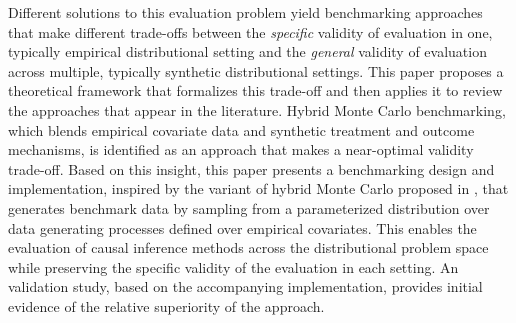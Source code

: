 \documentclass[../main.tex]{subfiles}
\begin{document}
    \vspace{\baselineskip}

    Different solutions to this evaluation problem yield benchmarking approaches that make different trade-offs between the \textit{specific} validity of evaluation in one, typically empirical distributional setting and the \textit{general} validity of evaluation across multiple, typically synthetic distributional settings. This paper proposes a theoretical framework that formalizes this trade-off and then applies it to review the approaches that appear in the literature. Hybrid Monte Carlo benchmarking, which blends empirical covariate data and synthetic treatment and outcome mechanisms, is identified as an approach that makes a near-optimal validity trade-off. Based on this insight, this paper presents a benchmarking design and implementation, inspired by the variant of hybrid Monte Carlo proposed in \textcite{Dorie2019Automated1}, that generates benchmark data by sampling from a parameterized distribution over data generating processes defined over empirical covariates. This enables the evaluation of causal inference methods across the distributional problem space while preserving the specific validity of the evaluation in each setting. An validation study, based on the accompanying implementation, provides initial evidence of the relative superiority of the approach.
\end{document}
